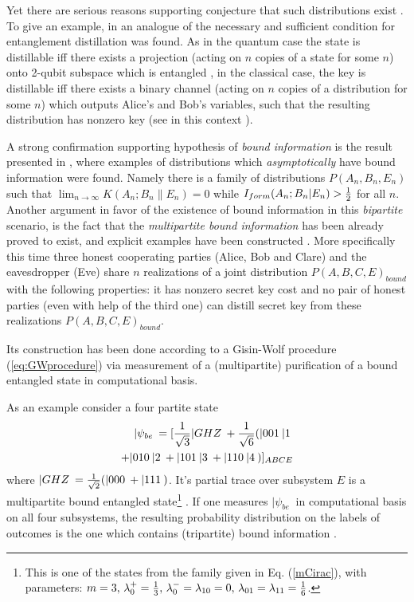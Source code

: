 \documentclass[twocolumn,aps,rmp]{revtex4}
\begin{document}
Yet there are serious reasons supporting conjecture that such
distributions exist
\cite{GiReWo02,RenWol02b}. To give an example, in \cite{RenWol02b}
an analogue of the necessary and sufficient condition for
entanglement distillation was found. As in the quantum case the
state is distillable iff there exists a projection (acting on $n$
copies of a state for some $n$) onto 2-qubit subspace which is
entangled \cite{bound}, in the classical case, the key is
distillable iff there exists a binary channel (acting on $n$ copies
of a distribution for some $n$) which outputs Alice's and Bob's
variables, such that the resulting distribution has nonzero key (see
in this context \cite{ALG_2_equiv,AcGisScar03,QKA_CKA_equivalance}).

A strong confirmation supporting hypothesis of {\it bound
information} is the result presented in \cite{renner-wolf-gap},
where examples of distributions which {\it asymptotically} have
bound information were found. Namely there is a family of
distributions $P(A_n,B_n,E_n)$ such that $\lim_{n\rightarrow \infty}
K(A_n;B_n\|E_n)=0$ while $I_{form}(A_n;B_n|E_n)>{1\over 2}$ for all $n$.
Another argument in favor of the existence of bound information in
this {\it bipartite} scenario, is the fact that the {\it
multipartite bound information} has been already proved to exist,
and explicit examples have been constructed \cite{AcinCM-MultiBoundInfo}.
More specifically this time three honest cooperating parties
(Alice, Bob and Clare) and the eavesdropper (Eve) share $n$
realizations of a joint distribution $P(A,B,C,E)_{bound}$ with the
following properties: it has nonzero secret key cost and no pair of
honest parties (even with help of the third one) can distill secret
key from these realizations $P(A,B,C,E)_{bound}$.

Its construction has been done according to a Gisin-Wolf procedure (\ref{eq:GWprocedure}) via measurement of a (multipartite) purification of a bound entangled state in computational basis.

As an example consider a four partite state
\begin{eqnarray}
|\psi_{be}\>=[{1\over{\sqrt{3}}}|GHZ\> +
{1\over{\sqrt{6}}}(|001\>|1\>
\nonumber\\
+|010\>|2\>+|101\>|3\>+|110\>|4\>)]_{ABCE}
\end{eqnarray}
where $|GHZ\>
={1\over{\sqrt{2}}}(|000\>+|111\>)$. It's partial trace over subsystem
$E$ is a multipartite bound entangled state\footnote{
This is one of the states from the family
given in Eq. (\ref{mCirac}), with parameters: $m=3,\, \lambda_0^+={1\over 3},\, \lambda_0^-=\lambda_{10}=0,\, \lambda_{01}=\lambda_{11}={1\over 6}$.} \cite{DCpur,DurC_multi_dist2000}.
If one measures $|\psi_{be}\>$ in computational basis on all four
subsystems, the resulting probability distribution on the labels of
outcomes is the one which contains (tripartite) bound information
\cite{AcinCM-MultiBoundInfo}.
\end{document}
